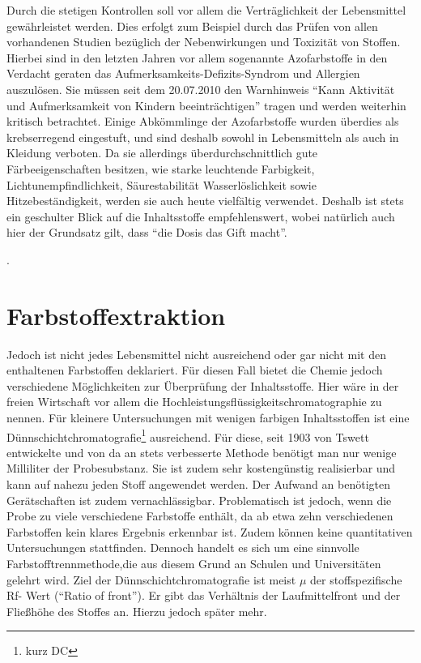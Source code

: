 \documentclass[11pt]{scrreprt}
\begin{document}
 Durch die stetigen Kontrollen soll vor allem die Verträglichkeit der Lebensmittel gewährleistet werden. Dies erfolgt zum Beispiel durch das Prüfen von allen vorhandenen Studien bezüglich der Nebenwirkungen und Toxizität von Stoffen. Hierbei sind in den letzten Jahren vor allem sogenannte Azofarbstoffe in den Verdacht geraten das Aufmerksamkeits-Defizits-Syndrom und Allergien auszulösen.  Sie müssen seit dem 20.07.2010 den Warnhinweis \enquote{Kann Aktivität und Aufmerksamkeit von Kindern beeinträchtigen} tragen und werden weiterhin kritisch betrachtet. Einige Abkömmlinge der Azofarbstoffe wurden überdies als krebserregend eingestuft, und sind  deshalb sowohl in Lebensmitteln  als auch in Kleidung verboten. Da sie allerdings überdurchschnittlich gute Färbeeigenschaften besitzen, wie starke leuchtende Farbigkeit, Lichtunempfindlichkeit, Säurestabilität Wasserlöslichkeit sowie Hitzebeständigkeit, werden sie auch heute vielfältig verwendet\cite[S.50]{Heinze.1986}. Deshalb ist stets ein geschulter Blick auf die Inhaltsstoffe empfehlenswert, wobei natürlich auch hier der Grundsatz gilt, dass \enquote{die Dosis das Gift macht}.

 \cite[S. 12]{Schobert.2007}. 
 
 
\chapter{Farbstoffextraktion}
Jedoch ist nicht jedes Lebensmittel nicht ausreichend oder gar nicht mit den enthaltenen Farbstoffen deklariert. Für diesen Fall bietet die Chemie jedoch verschiedene Möglichkeiten zur Überprüfung der Inhaltsstoffe. Hier wäre in der freien Wirtschaft vor allem die Hochleistungsflüssigkeitschromatographie zu nennen. Für kleinere Untersuchungen mit wenigen farbigen Inhaltsstoffen ist eine Dünnschichtchromatografie\footnote{kurz DC} ausreichend. Für diese, seit 1903 von Tswett entwickelte und von da an stets verbesserte Methode benötigt man nur wenige Milliliter der Probesubstanz. Sie ist zudem sehr kostengünstig realisierbar und kann auf nahezu jeden Stoff angewendet werden. Der Aufwand an benötigten Gerätschaften ist zudem vernachlässigbar. Problematisch ist jedoch, wenn die Probe zu viele verschiedene Farbstoffe enthält, da ab etwa zehn verschiedenen Farbstoffen kein klares Ergebnis erkennbar ist. Zudem können keine quantitativen Untersuchungen stattfinden. Dennoch handelt es sich um eine sinnvolle Farbstofftrennmethode,die aus diesem Grund  an Schulen und Universitäten gelehrt wird. Ziel der Dünnschichtchromatografie ist meist $\mu$ der stoffspezifische Rf- Wert (\enquote{Ratio of front}).  Er gibt das Verhältnis der Laufmittelfront und der Fließhöhe des Stoffes an. Hierzu jedoch später mehr\cite[S.117-123]{Wittke,1984}.
\end{document}
